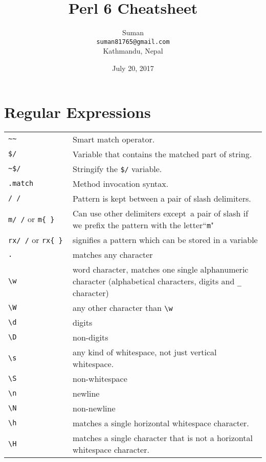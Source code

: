 \documentclass[12pt]{article}
\title{\huge\textbf{Perl 6 Cheatsheet}}
\author{Suman \\ \texttt{suman81765@gmail.com}\\ Kathmandu, Nepal}
\date{July 20, 2017}
\begin{document}
	\maketitle
	\section{Regular Expressions}
	\begin{longtable}{p{0.25\linewidth}p{0.75\linewidth}}
		\toprule
		\verb!~~!   & Smart match operator. \\
		\verb!$/!  & Variable that contains the matched part of string. \\
		\verb!~$/! & Stringify the \verb!$/! variable. \\
		\verb!.match!  & Method invocation syntax. \\
		\verb!/ /!  & Pattern is kept between a pair of slash delimiters.\\
		\verb|m/ /| or \verb|m{ }|	& Can use other delimiters except\ a pair of slash if we prefix the pattern with the letter``\verb|m|"\\
		\verb|rx/ /| or \verb|rx{ }| & 	signifies a pattern which can be stored in a variable\\
		\verb|.| & matches any character\\
		\verb|\w| &	word character, matches one single alphanumeric character (alphabetical characters, digits and \verb|_| character)\\		
		\verb|\W|	& any other character than \verb|\w|\\
		\verb|\d|	& digits\\
		\verb|\D|	& non-digits\\
		\verb|\s|	& any kind of whitespace, not just vertical whitespace.\\
		\verb|\S|	& non-whitespace\\
		\verb|\n|	& newline\\
		\verb|\N|	& non-newline\\
		
		\verb|\h| & matches a single horizontal whitespace character.\\
		\verb|\H| & matches a single character that is not a horizontal whitespace character.\\
		

\end{longtable}
\end{document}
